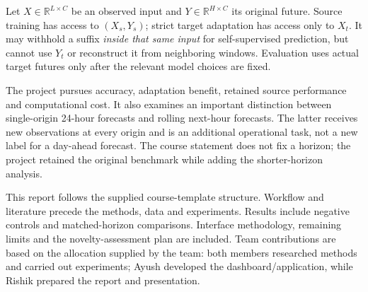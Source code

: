 \documentclass[twoside,english]{article}
\begin{document}
Let $X\in\mathbb R^{L\times C}$ be an observed input and $Y\in\mathbb R^{H\times C}$ its original future. Source training has access to $(X_s,Y_s)$; strict target adaptation has access only to $X_t$. It may withhold a suffix \emph{inside that same input} for self-supervised prediction, but cannot use $Y_t$ or reconstruct it from neighboring windows. Evaluation uses actual target futures only after the relevant model choices are fixed.

The project pursues accuracy, adaptation benefit, retained source performance and computational cost. It also examines an important distinction between single-origin 24-hour forecasts and rolling next-hour forecasts. The latter receives new observations at every origin and is an additional operational task, not a new label for a day-ahead forecast. The course statement does not fix a horizon; the project retained the original benchmark while adding the shorter-horizon analysis.

This report follows the supplied course-template structure. Workflow and literature precede the methods, data and experiments. Results include negative controls and matched-horizon comparisons. Interface methodology, remaining limits and the novelty-assessment plan are included. Team contributions are based on the allocation supplied by the team: both members researched methods and carried out experiments; Ayush developed the dashboard/application, while Rishik prepared the report and presentation.
\end{document}
